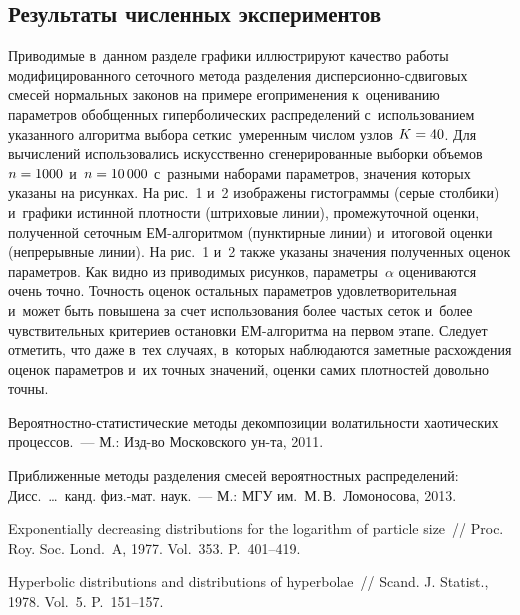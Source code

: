 \begin{multicols}{2}
\section{Результаты численных экспериментов}

Приводимые в~данном разделе графики иллюстрируют качество работы
модифицированного сеточного метода разделения дис\-пер\-си\-он\-но-сдви\-го\-вых
смесей нормальных законов на примере его\linebreak применения к~оцениванию
параметров обоб\-щенных гиперболических распределений с~ис\-поль\-зованием
указанного алгоритма выбора сетки\linebreak с~умеренным чис\-лом узлов $K\hm=40$.
Для вы\-чис\-ле\-ний использовались искусственно сгенерированные выборки
объемов $n\hm=1000$ и~$n\hm=10\,000$ с~разными наборами параметров, значения
которых указаны на рисунках. На рис.~1 и~2 изображены гистограммы
(серые столбики) и~графики
истинной плот\-ности (штриховые линии), промежуточной
оценки, полученной сеточным ЕМ-ал\-го\-рит\-мом (пунктирные линии)
и~итоговой оценки (непрерывные линии). На рис.~1 и~2 так\-же указаны
значения полученных оценок параметров. Как видно из приводимых
рисунков, параметры~$\alpha$ оцениваются очень точно. Точность
оценок остальных параметров удовлетворительная и~может быть повышена
за счет использования более частых сеток и~более чувствительных
критериев остановки ЕМ-ал\-го\-рит\-ма на первом этапе. Следует отметить,
что даже в~тех случаях, в~которых наблюдаются заметные расхождения
оценок параметров и~их точных значений, оценки самих плотностей
довольно \mbox{точны}.




{\small\frenchspacing
 {%
 \begin{thebibliography}{99}
 Ве\-ро\-ят\-но\-ст\-но-ста\-ти\-сти\-че\-ские методы
декомпозиции волатильности хаотических процессов.~--- М.: Изд-во
Московского ун-та, 2011.

 Приближенные методы разделения смесей
вероятностных распределений: Дисс.\ \ldots\  канд. физ.-мат. наук.~--- М.:
МГУ им.\ М.\,В.~Ломоносова, 2013.

 Exponentially decreasing distributions
for the logarithm of particle size~// Proc. Roy. Soc. Lond.~A,
1977. Vol.~353. P.~401--419.

 Hyperbolic distributions and
distributions of hyperbolae~// Scand. J. Statist., 1978. Vol.~5.
P.~151--157.


\end{thebibliography}}}
\end{multicols}
